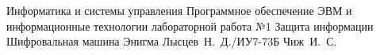 \documentclass{bmstu}
\begin{document}
\makereporttitle
{Информатика и системы управления} %
{Программное обеспечение ЭВМ и информационные технологии}
{лабораторной работа №1} %
{Защита информации} %
{Шифровальная машина Энигма} %
{} %
{Лысцев~Н.~Д./ИУ7-73Б} %
{Чиж~И.~С.} %
{}

\maketableofcontents





%


\makebibliography
\end{document}
